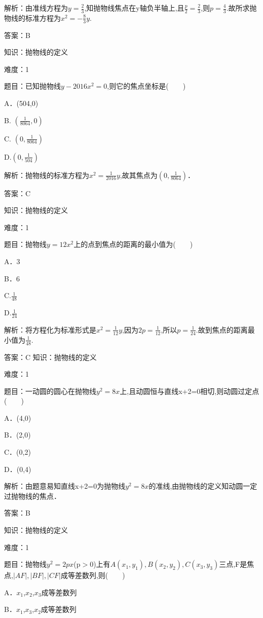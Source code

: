 \documentclass{article} %
\begin{document}
解析：由准线方程为$y=\frac{2}{3}$,知抛物线焦点在y轴负半轴上,且$\frac{p}{2}=\frac{2}{3}$,则$p=\frac{4}{3}$.故所求抛物线的标准方程为$x^{2}=-\frac{8}{3}y$.

答案：B



知识：抛物线的定义

难度：1

题目：已知抛物线$y-2016x^{2}=0$,则它的焦点坐标是(　　)

A．(504,0)   

B. $(\frac{1}{8064}, 0)$

C. $(0, \frac{1}{8064})$ 

D.$(0, \frac{1}{504})$

解析：抛物线的标准方程为$x^{2}=\frac{1}{2016}y$,故其焦点为$(0,\frac{1}{8064})$．

答案：C



知识：抛物线的定义

难度：1

题目：抛物线$y=12x^{2}$上的点到焦点的距离的最小值为(　　)

A．3  

B．6  

C.$\frac{1}{48}$

D.$\frac{1}{24}$

解析：将方程化为标准形式是$x^{2}=\frac{1}{12}y$,因为$2p=\frac{1}{12}$,所以$p=\frac{1}{24}$.故到焦点的距离最小值为$\frac{1}{48}$.

答案：C
知识：抛物线的定义

难度：1

题目：一动圆的圆心在抛物线$y^{2}=8x$上,且动圆恒与直线x+2=0相切,则动圆过定点(　　)

A．(4,0)   

B．(2,0)

C．(0,2)   

D．(0,4)

解析：由题意易知直线x+2=0为抛物线$y^{2}=8x$的准线,由抛物线的定义知动圆一定过抛物线的焦点．

答案：B



知识：抛物线的定义

难度：1

题目：抛物线$y^{2}=2px$(p${>}$0)上有$A(x_{1},y_{1}),B(x_{2},y_{2}),C(x_{3},y_{3})$三点,F是焦点,$|AF|,|BF|,|CF|$成等差数列,则(　　)

A．$x_{1}$,$x_{2}$,$x_{3}$成等差数列

B．$x_{1}$,$x_{3}$,$x_{2}$成等差数列
\end{document}
